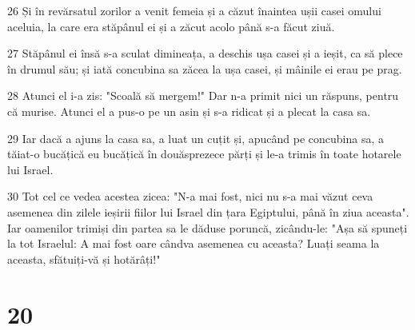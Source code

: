 \par 26 Și în revărsatul zorilor a venit femeia și a căzut înaintea ușii casei omului aceluia, la care era stăpânul ei și a zăcut acolo până s-a făcut ziuă.
\par 27 Stăpânul ei însă s-a sculat dimineața, a deschis ușa casei și a ieșit, ca să plece în drumul său; și iată concubina sa zăcea la ușa casei, și mâinile ei erau pe prag.
\par 28 Atunci el i-a zis: "Scoală să mergem!" Dar n-a primit nici un răspuns, pentru că murise. Atunci el a pus-o pe un asin și s-a ridicat și a plecat la casa sa.
\par 29 Iar dacă a ajuns la casa sa, a luat un cuțit și, apucând pe concubina sa, a tăiat-o bucățică eu bucățică în douăsprezece părți și le-a trimis în toate hotarele lui Israel.
\par 30 Tot cel ce vedea acestea zicea: "N-a mai fost, nici nu s-a mai văzut ceva asemenea din zilele ieșirii fiilor lui Israel din țara Egiptului, până în ziua aceasta". Iar oamenilor trimiși din partea sa le dăduse poruncă, zicându-le: "Așa să spuneți la tot Israelul: A mai fost oare cândva asemenea cu aceasta? Luați seama la aceasta, sfătuiți-vă și hotărâți!"

\chapter{20}

